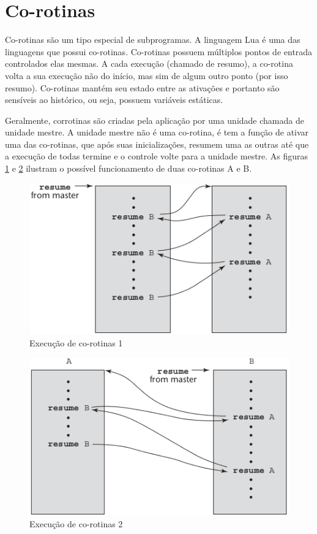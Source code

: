 \section{Co-rotinas} 
\label{sec:co_rotinas}
Co-rotinas são um tipo especial de subprogramas. A linguagem Lua é uma das linguagens que possui co-rotinas. Co-rotinas possuem múltiplos pontos de entrada controlados elas mesmas. A cada execução (chamado de resumo), a co-rotina volta a sua execução não do início, mas sim de algum outro ponto (por isso resumo). Co-rotinas mantém seu estado entre as ativações e portanto são sensíveis ao histórico, ou seja, possuem variáveis estáticas.

Geralmente, corrotinas são criadas pela aplicação por uma unidade chamada de unidade mestre. A unidade mestre não é uma co-rotina, é tem a função de ativar uma das co-rotinas, que após suas inicializações, resumem uma as outras até que a execução de todas termine e o controle volte para a unidade mestre. As figuras \ref{co-rotinas} e \ref{co-rotinas_b} ilustram o possível funcionamento de duas co-rotinas A e B.

\begin{figure}[ht!]
 \centering
 \includegraphics[scale=0.65]{./imagens/coroutines.png}
 \caption{Execução de co-rotinas 1 \cite{sebesta}}
\label{co-rotinas}
\end{figure}

\begin{figure}[ht!]
 \centering
 \includegraphics[scale=0.65]{./imagens/coroutines_b.png}
 \caption{Execução de co-rotinas 2 \cite{sebesta}}
\label{co-rotinas_b}
\end{figure}
